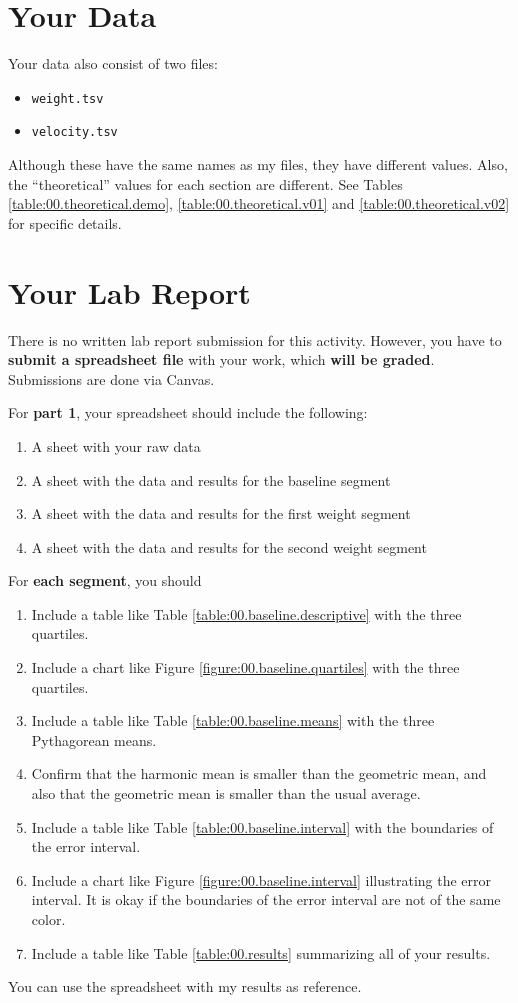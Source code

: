 \section{Your Data}
Your data also consist of two files:
\begin{itemize}
    \item \texttt{weight.tsv}
    \item \texttt{velocity.tsv}
\end{itemize}
Although these have the same names as my files, they have different values. Also, the ``theoretical'' values for each section are different. See Tables \ref{table:00.theoretical.demo}, \ref{table:00.theoretical.v01} and \ref{table:00.theoretical.v02} for specific details.
\section{Your Lab Report}
There is no written lab report submission for this activity. However, you have to \textbf{submit a spreadsheet file} with your work, which \textbf{will be graded}. Submissions are done via Canvas.

For \textbf{part 1}, your spreadsheet should include the following:
\begin{enumerate}
    \item A sheet with your raw data
    \item A sheet with the data and results for the baseline segment
    \item A sheet with the data and results for the first weight segment
    \item A sheet with the data and results for the second weight segment
\end{enumerate}
For \textbf{each segment}, you should
\begin{enumerate}
    \item Include a table like Table \ref{table:00.baseline.descriptive} with the three quartiles.
    \item Include a chart like Figure \ref{figure:00.baseline.quartiles} with the three quartiles.
    \item Include a table like Table \ref{table:00.baseline.means} with the three Pythagorean means.
    \item Confirm that the harmonic mean is smaller than the geometric mean, and also that the geometric mean is smaller than the usual average.
    \item Include a table like Table \ref{table:00.baseline.interval} with the boundaries of the error interval.
    \item Include a chart like Figure \ref{figure:00.baseline.interval} illustrating the error interval. It is okay if the boundaries of the error interval are not of the same color.
    \item Include a table like Table \ref{table:00.results} summarizing all of your results.
\end{enumerate}
You can use the spreadsheet with my results as reference.

